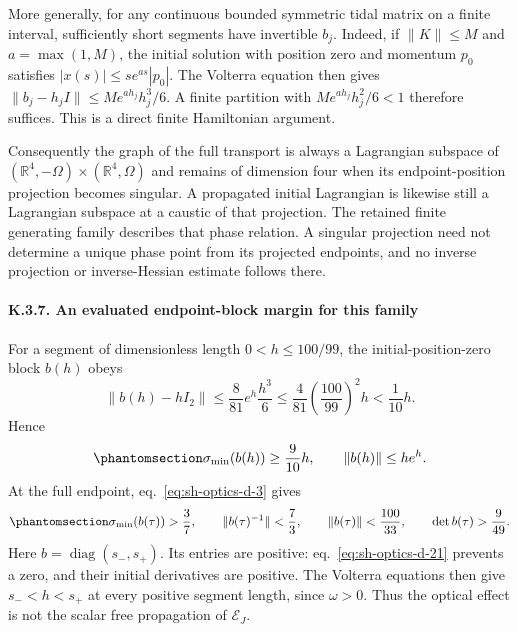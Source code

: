 \documentclass[
  english,
  11pt,
  reqno]{amsart}
\begin{document}
More generally, for any continuous bounded symmetric tidal matrix on a
finite interval, sufficiently short segments have invertible \(b_j\).
Indeed, if \(\|K\|\le M\) and \(a=\max(1,M)\), the initial solution with
position zero and momentum \(p_0\) satisfies
\(|x(s)|\le s e^{as}|p_0|\). The Volterra equation then gives
\(\|b_j-h_jI\|\le M e^{ah_j}h_j^3/6\). A finite partition with
\(M e^{ah_j}h_j^2/6<1\) therefore suffices. This is a direct finite
Hamiltonian argument.

Consequently the graph of the full transport is always a Lagrangian
subspace of \((\mathbb R^4,-\Omega)\times(\mathbb R^4,\Omega)\) and
remains of dimension four when its endpoint-position projection becomes
singular. A propagated initial Lagrangian is likewise still a Lagrangian
subspace at a caustic of that projection. The retained finite generating
family describes that phase relation. A singular projection need not
determine a unique phase point from its projected endpoints, and no
inverse projection or inverse-Hessian estimate follows there.

\protect{}\label{sec:sh-optics-7}

\paragraph{K.3.7. An evaluated endpoint-block margin for this
family}\label{k.3.7.-an-evaluated-endpoint-block-margin-for-this-family}

For a segment of dimensionless length \(0<h\le100/99\), the
initial-position-zero block \(b(h)\) obeys \[
 \|b(h)-hI_2\|
 \le\frac8{81}e^h\frac{h^3}{6}
 \le\frac4{81}\left(\frac{100}{99}\right)^2 h
 <\frac1{10}h.
\] Hence
\begin{equation}\protect\phantomsection\label{eq:sh-optics-d-21}{
 \sigma_{\min}(b(h))\ge\frac9{10}h,\qquad
 \|b(h)\|\le h e^h.
}\end{equation} At the full endpoint, eq.~\ref{eq:sh-optics-d-3} gives
\begin{equation}\protect\phantomsection\label{eq:sh-optics-d-22}{
 \sigma_{\min}(b(\tau))>\frac37,\qquad
 \|b(\tau)^{-1}\|<\frac73,\qquad
 \|b(\tau)\|<\frac{100}{33},\qquad
 \det b(\tau)>\frac9{49}.
}\end{equation} Here \(b=\operatorname{diag}(s_-,s_+)\). Its entries are
positive: eq.~\ref{eq:sh-optics-d-21} prevents a zero, and their initial
derivatives are positive. The Volterra equations then give \(s_-<h<s_+\)
at every positive segment length, since \(\omega>0\). Thus the optical
effect is not the scalar free propagation of \(\mathcal E_J\).
\end{document}
